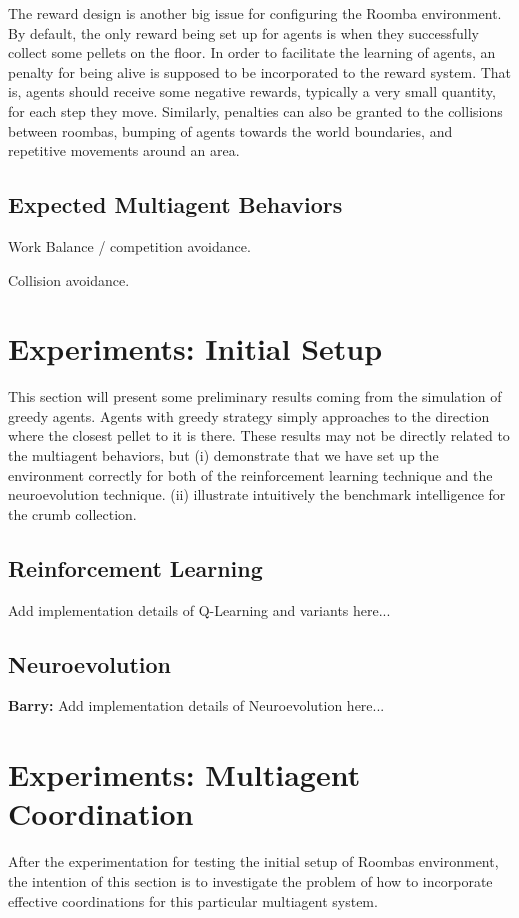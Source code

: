 \documentclass[conference]{IEEEtran}
\begin{document}
The reward design is another big issue for
configuring the Roomba environment. By default, the only reward being set up
for agents is when they successfully collect some pellets on the floor. In
order to facilitate the learning of agents, an penalty for being alive is
supposed to be incorporated to the reward system. That is, agents should
receive some negative rewards, typically a very small quantity, for each step
they move. Similarly, penalties can also be granted to the collisions between
roombas, bumping of agents towards the world boundaries, and repetitive
movements around an area.


\subsection{Expected Multiagent Behaviors}
Work Balance / competition avoidance. 

Collision avoidance. 


\section{Experiments: Initial Setup}
This section will present some preliminary results coming from the simulation
of greedy agents. Agents with greedy strategy simply approaches to the direction
where the closest pellet to it is there.  These results may not be directly
related to the multiagent behaviors, but 
(i) demonstrate that we have set up the environment correctly for both
of the reinforcement learning technique and the neuroevolution technique. 
(ii) illustrate intuitively the benchmark intelligence for the crumb
collection.

\subsection{Reinforcement Learning}
Add implementation details of Q-Learning and variants here...

\subsection{Neuroevolution}
\textbf{Barry:}
Add implementation details of Neuroevolution here...

\section{Experiments: Multiagent Coordination}
After the experimentation for testing the initial setup of Roombas
environment, the intention of this section is to investigate the problem of
how to incorporate effective coordinations for this particular multiagent
system.
\end{document}
